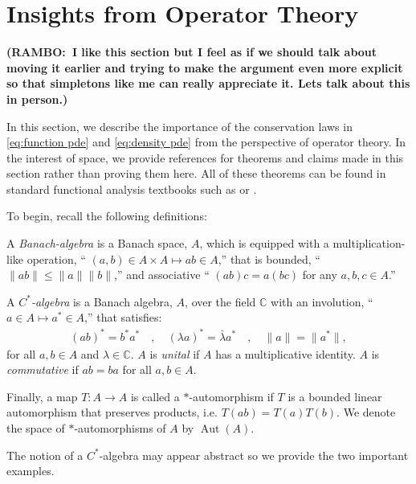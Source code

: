 \documentclass[final,leqno]{siamltex1213}
\newcommand{\ram}[1]{{\normalsize{\textbf{({\color{red}RAMBO:\ }#1)}}}}
\begin{document}
\section{Insights from Operator Theory}
\ram{I like this section but I feel as if we should talk about moving it earlier and trying to make the argument even more explicit so that simpletons like me can really appreciate it. Lets talk about this in person.} 

In this section, we describe the importance of the conservation laws in \eqref{eq:function pde} and \eqref{eq:density pde} from the perspective of operator theory.
In the interest of space, we provide references for theorems and claims made in this section rather than proving them here.
All of these theorems can be found in standard functional analysis textbooks such as \cite{Conway1990} or \cite{Rudin1991}.

To begin, recall the following definitions:
\begin{definition}
	A \emph{Banach-algebra} is a Banach space, $A$, which is equipped with a multiplication-like operation, `` $(a,b) \in A \times A \mapsto ab \in A$,''  that is bounded, `` $\| ab \| \leq \|a \| \|b \|$,'' and associative `` $(ab)c = a(bc)$ for any $a,b,c \in A$.''
	
	A \emph{$C^{*}$-algebra} is a Banach algebra, $A$, over the field $\mathbb{C}$ with an involution, `` $a \in A \mapsto a^{*} \in A$,'' that satisfies:
	\begin{align}
		(ab)^{*} = b^{*} a^{*} \quad,\quad
		(\lambda a)^{*} = \bar{\lambda} a^{*} \quad,\quad
		\| a \| = \| a^{*}\|,
	\end{align}
	for all $a,b \in A$ and $\lambda \in \mathbb{C}$.
	$A$ is \emph{unital} if $A$ has a multiplicative identity.
	$A$ is \emph{commutative} if $ab = ba$ for all $a,b \in A$.
	
	Finally, a map $T:A \to A$ is called a $*$-automorphism if $T$ is a bounded linear automorphism that preserves products, i.e. $T(ab) = T(a) T(b)$.
	We denote the space of $*$-automorphisms of $A$ by $\operatorname{Aut}(A)$.
\end{definition}

The notion of a $C^{*}$-algebra may appear abstract so we provide the two important examples.
\end{document}
